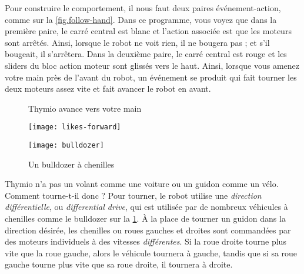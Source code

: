 
Pour construire le comportement, il nous faut deux paires événement-action, comme sur la \cref{fig.follow-hand}.
Dans ce programme, vous voyez que dans la première paire, le carré central est blanc et l'action associée est que les moteurs sont arrêtés.
Ainsi, lorsque le robot ne voit rien, il ne bougera pas ; et s'il bougeait, il s'arrêtera.
Dans la deuxième paire, le carré central est rouge et les sliders du bloc action moteur sont glissés vers le haut.
Ainsi, lorsque vous amenez votre main près de l'avant du robot, un événement se produit qui fait tourner les deux moteurs assez vite et fait avancer le robot en avant.


\begin{figure}
\begin{floatrow}
	\ffigbox
	{\caption{Thymio avance vers votre main}\label{fig.follow-hand}}
	{\texttt{[image: likes-forward]}}
	\ffigbox
	{\caption{Un bulldozer à chenilles}\label{fig.bull}}
	{\texttt{[image: bulldozer]}}
\end{floatrow}
\end{figure}


Thymio n'a pas un volant comme une voiture ou un guidon comme un vélo.
Comment tourne-t-il donc ? 
Pour tourner, le robot utilise une \emph{direction différentielle}, ou \emph{differential drive}, qui est  utilisée par de nombreux véhicules à chenilles comme le bulldozer sur la \cref{fig.bull}.
À la place de tourner un guidon dans la direction désirée, les chenilles ou roues gauches et droites sont commandées par des moteurs individuels à des vitesses \emph{différentes}.
Si la roue droite tourne plus vite que la roue gauche, alors le véhicule tournera à gauche, tandis que si sa roue gauche tourne plus vite que sa roue droite, il tournera à droite.


